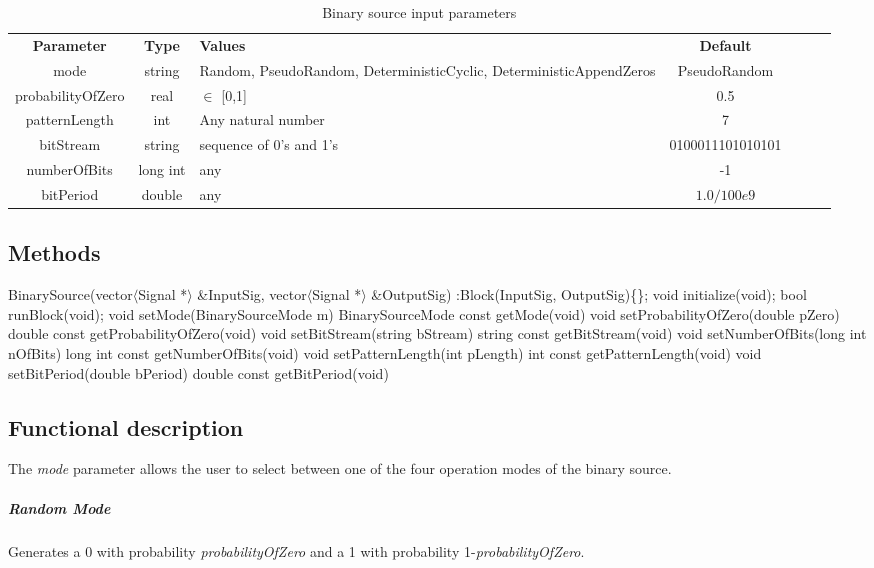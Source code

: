 \begin{table}[h]
	\centering
	\begin{tabular}{|c|c|p{60mm}|c|ccp{60mm}}
		\cline{1-4}
		\textbf{Parameter} & \textbf{Type} & \textbf{Values} &   \textbf{Default}& \\ \cline{1-4}
		mode & string & Random, PseudoRandom, DeterministicCyclic, DeterministicAppendZeros & PseudoRandom \\ \cline{1-4}
		probabilityOfZero & real & $\in$ [0,1] & 0.5 \\ \cline{1-4}
		patternLength & int &  Any natural number & 7 \\ \cline{1-4}
		bitStream & string & sequence of 0's and 1's & 0100011101010101 \\ \cline{1-4}
		numberOfBits & long int & any & -1 \\ \cline{1-4}
		bitPeriod & double & any & $1.0/100e9$ \\ \cline{1-4}
	\end{tabular}
	\caption{Binary source input parameters}
	\label{table:bin_sour_in_par}
\end{table}

\subsection*{Methods}

BinarySource(vector$\langle$Signal *$\rangle$ \&InputSig, vector$\langle$Signal *$\rangle$ \&OutputSig) :Block(InputSig, OutputSig)\{\};
\bigbreak	
void initialize(void);
\bigbreak	
bool runBlock(void);
\bigbreak	
void setMode(BinarySourceMode m)
BinarySourceMode const getMode(void)
\bigbreak	
void setProbabilityOfZero(double pZero)
\bigbreak
double const getProbabilityOfZero(void)
\bigbreak	
void setBitStream(string bStream)
\bigbreak
string const getBitStream(void)
\bigbreak	
void setNumberOfBits(long int nOfBits)
\bigbreak
long int const getNumberOfBits(void)
\bigbreak	
void setPatternLength(int pLength)
\bigbreak
int const getPatternLength(void)
\bigbreak	
void setBitPeriod(double bPeriod)
\bigbreak
double const getBitPeriod(void)

\subsection*{Functional description}

The \textit{mode} parameter allows the user to select between one of the four operation modes of the binary source.

\subparagraph*{Random Mode}
Generates a 0 with probability \textit{probabilityOfZero} and a 1 with probability 1-\textit{probabilityOfZero}.

